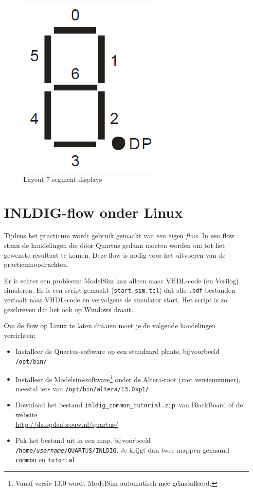 \documentclass[a4paper,12pt,fleqn,twoside]{book}
\newcommand{\naam}[1]{\texttt{#1}}
\begin{document}
\begin{figure}[H]
\centering
\includegraphics[scale=0.25]{004layout7seg.png}
\caption{Layout 7-segment displays}
\label{fig:004layout7seg}
\end{figure}



\chapter{INLDIG-flow onder Linux}
\label{chap:inldigflowonderlinux}
Tijdens het practicum wordt gebruik gemaakt van een eigen \textsl{flow}.
In een flow staan de handelingen die door Quartus gedaan moeten worden om
tot het gewenste resultaat te komen. Deze flow is nodig voor het uitvoeren
van de practicumopdrachten. 

Er is echter een probleem: ModelSim kan alleen maar VHDL-code (en Verilog)
simuleren. Er is een script gemaakt (\lstinline|start_sim.tcl|) dat alle
\naam{.bdf}-bestanden vertaalt naar VHDL-code en vervolgens de simulator
start. Het script is zo geschreven dat het ook op Windows draait.

Om de flow op Linux te laten draaien moet je de volgende handelingen
verrichten:

\begin{itemize}\itemsep-1pt
\item Installeer de Quartus-software op een standaard plaats, bijvoorbeeld
      \lstinline|/opt/bin/|
\item Installeer de Modelsim-software\footnote{Vanaf versie 13.0 wordt
      ModelSim automatisch mee-ge\"{\i}nstalleerd.} onder de Altera-root
      (met versienummer), meestal iets van \lstinline|/opt/bin/altera/13.0sp1/| 
\item Download het bestand \lstinline|inldig_common_tutorial.zip |van
      BlackBoard of de website\\ \url{http://ds.opdenbrouw.nl/quartus/} 
\item Pak het bestand uit in een map, bijvoorbeeld
      \naam{/home/\textsl{username}/QUARTUS/INLDIG}. Je krijgt dan twee
      mappen genaamd \naam{common} en \naam{tutorial}
\end{itemize}
\end{document}
